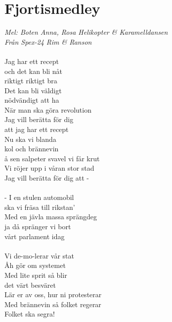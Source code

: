 \documentclass[a5paper,15pt]{article}
\begin{document}
\section{Fjortismedley}
\emph{Mel: Boten Anna, Rosa Helikopter \& Karamelldansen \\
Från Spex-24 Rim \& Ranson}\\
\\
Jag har ett recept\\
och det kan bli nåt\\
riktigt riktigt bra\\
Det kan bli väldigt\\
nödvändigt att ha\\
När man ska göra revolution\\
Jag vill berätta för dig\\
att jag har ett recept\\
Nu ska vi blanda\\
kol och brännevin\\
å sen salpeter svavel vi får krut\\
Vi röjer upp i våran stor stad\\
Jag vill berätta för dig att -\\
\\
- I en stulen automobil\\
ska vi fräsa till rikstan'\\
Med en jävla massa sprängdeg\\
ja då spränger vi bort\\
vårt parlament idag\\
\\
Vi de-mo-lerar vår stat\\
Åh gör om systemet\\
Med lite sprit så blir\\
det värt besväret\\
Lär er av oss, hur ni protesterar\\
Med brännevin så folket regerar\\
Folket ska segra!
\end{document}
